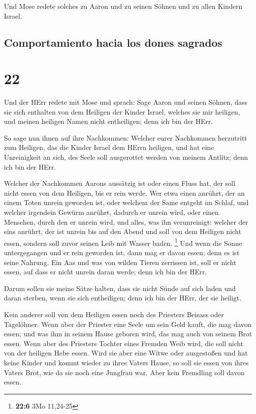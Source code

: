  Und Mose redete solches zu Aaron und zu seinen Söhnen
und zu allen Kindern Israel.

\hypertarget{comportamiento-hacia-los-dones-sagrados}{%
\subsection{Comportamiento hacia los dones
sagrados}\label{comportamiento-hacia-los-dones-sagrados}}

\hypertarget{section-21}{%
\section{22}\label{section-21}}

 Und der HErr redete mit Mose und sprach: 
Sage Aaron und seinen Söhnen, dass sie sich enthalten von dem Heiligen
der Kinder Israel, welches sie mir heiligen, und meinen heiligen Namen
nicht entheiligen; denn ich bin der HErr.

 So sage nun ihnen auf ihre Nachkommen: Welcher eurer
Nachkommen herzutritt zum Heiligen, das die Kinder Israel dem HErrn
heiligen, und hat eine Unreinigkeit an sich, des Seele soll ausgerottet
werden von meinem Antlitz; denn ich bin der HErr.

 Welcher der Nachkommen Aarons aussätzig ist oder einen
Fluss hat, der soll nicht essen von dem Heiligen, bis er rein werde. Wer
etwa einen anrührt, der an einem Toten unrein geworden ist, oder welchem
der Same entgeht im Schlaf,  und welcher irgendein Gewürm
anrührt, dadurch er unrein wird, oder einen Menschen, durch den er
unrein wird, und alles, was ihn verunreinigt:  welcher der
eins anrührt, der ist unrein bis auf den Abend und soll von dem Heiligen
nicht essen, sondern soll zuvor seinen Leib mit Wasser baden.
\footnote{\textbf{22:6} 3Mo 11,24-25}  Und wenn die Sonne
untergegangen und er rein geworden ist, dann mag er davon essen; denn es
ist seine Nahrung.  Ein Aas und was von wilden Tieren
zerrissen ist, soll er nicht essen, auf dass er nicht unrein daran
werde; denn ich bin der HErr.

 Darum sollen sie meine Sätze halten, dass sie nicht Sünde
auf sich laden und daran sterben, wenn sie sich entheiligen; denn ich
bin der HErr, der sie heiligt.

 Kein anderer soll von dem Heiligen essen noch des
Priesters Beisass oder Tagelöhner.  Wenn aber der
Priester eine Seele um sein Geld kauft, die mag davon essen; und was ihm
in seinem Hause geboren wird, das mag auch von seinem Brot essen.
 Wenn aber des Priesters Tochter eines Fremden Weib wird,
die soll nicht von der heiligen Hebe essen.  Wird sie
aber eine Witwe oder ausgestoßen und hat keine Kinder und kommt wieder
zu ihres Vaters Hause, so soll sie essen von ihres Vaters Brot, wie da
sie noch eine Jungfrau war. Aber kein Fremdling soll davon essen.

